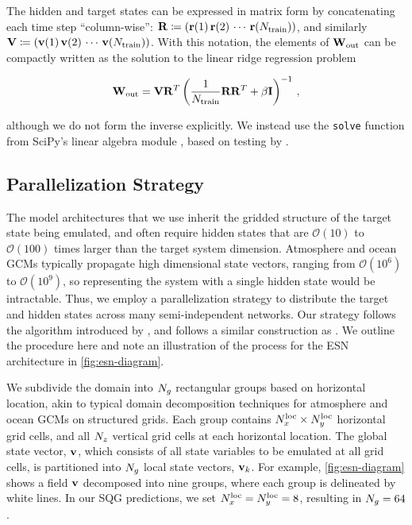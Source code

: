 The hidden and target states can be expressed in matrix form by concatenating
each time step ``column-wise'':
$\mathbf{R} \coloneqq (\mathbf{r}(1) \, \mathbf{r}(2) \, \cdots \, \mathbf{r}(N_\text{train}))$,
and similarly\\
\noindent$\mathbf{V} \coloneqq (\mathbf{v}(1) \, \mathbf{v}(2) \, \cdots \, \mathbf{v}(N_\text{train}))$.
With this notation, the elements of $\mathbf{W}_\text{out}$ can be compactly written as the
solution to the linear ridge regression problem
\begin{linenomath*}\begin{equation}
    \mathbf{W}_\text{out} = \mathbf{V} \mathbf{R}^T \left(\dfrac{1}{N_\text{train}}\mathbf{R}\mathbf{R}^T +
    \beta\mathbf{I}\right)^{-1} \, ,
    \label{eq:ridge_regression}
\end{equation}\end{linenomath*}
although we do not form the inverse explicitly.
We instead use the \texttt{solve} function from SciPy's linear algebra module
\citep{scipy_2020}, based on testing by
\citet{platt_systematic_2022}.


\subsection{Parallelization Strategy}
\label{subsec:parallelization}

The model architectures that we use inherit the gridded structure of the target
state being emulated, and often require hidden states that are
$\mathcal{O}(10)$ to $\mathcal{O}(100)$ times larger than the target system dimension.
Atmosphere and ocean GCMs typically propagate high dimensional state vectors, ranging from $\mathcal{O}(10^6)$ to $\mathcal{O}(10^9)$,
so representing the system with a single hidden state would be intractable.
Thus, we employ a parallelization strategy to distribute the target and hidden
states across many semi-independent networks.
Our strategy follows the algorithm introduced by \citet{pathak_model-free_2018},
and follows a similar construction as \citet{arcomano_machine_2020}.
We outline the procedure here and note an illustration of the process for
the ESN architecture in \cref{fig:esn-diagram}.

We subdivide the domain into $N_{g}$ rectangular groups based on horizontal location,
akin to typical domain decomposition techniques for atmosphere and ocean
GCMs on structured grids.
Each group contains
$N_{x}^\text{loc}\times N_{y}^\text{loc}$ horizontal grid cells, and all $N_{z}$
vertical grid cells at each horizontal location.
The global state vector, $\mathbf{v}$, which consists of all state variables to be
emulated at all grid cells, is partitioned into $N_{g}$ local state vectors,
$\mathbf{v}_{k}$.
For example, \cref{fig:esn-diagram} shows a field $\mathbf{v}$ decomposed into nine
groups, where each group is delineated by white lines.
In our SQG predictions, we set $N_{x}^\text{loc} = N_{y}^\text{loc} = 8$, resulting in
$N_{g}=64$.

